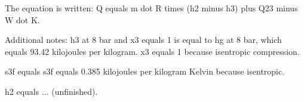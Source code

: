 The equation is written:  
Q equals m dot R times (h2 minus h3) plus Q23 minus W dot K.  

Additional notes:  
h3 at 8 bar and x3 equals 1 is equal to hg at 8 bar, which equals 93.42 kilojoules per kilogram.  
x3 equals 1 because isentropic compression.  

s3f equals s3f equals 0.385 kilojoules per kilogram Kelvin because isentropic.  

h2 equals ... (unfinished).